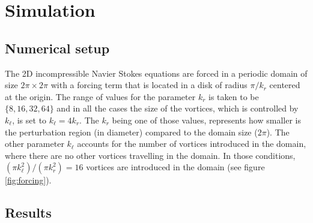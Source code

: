\documentclass[../main.tex]{subfiles}
\begin{document}
\section{Simulation}
\subsection{Numerical setup}\label{sec:numerical}
The 2D incompressible Navier Stokes equations are forced in a periodic domain of size $2\pi \times 2\pi$ with a forcing term that is located in a disk of radius $\pi/k_r$ centered at the origin. The range of values for the parameter $k_r$ is taken to be $\{8, 16, 32, 64\}$ and in all the cases the size of the vortices, which is controlled by $k_\ell$, is set to $k_\ell = 4 k_r$. The $k_r$ being one of those values, represents how smaller is the perturbation region (in diameter) compared to the domain size ($2\pi$). The other parameter $k_\ell$ accounts for the number of vortices introduced in the domain, where there are no other vortices travelling in the domain. In those conditions, $(\pi k_\ell^2)/(\pi k_r^2) = 16$ vortices are introduced in the domain (see figure \ref{fig:forcing}).

\subsection{Results}\label{sec:results}
\end{document}
